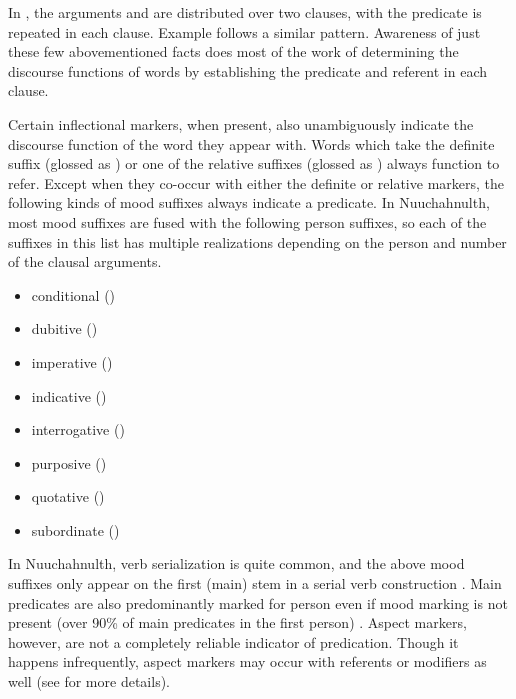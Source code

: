 
\noindent In , the arguments   and   are distributed over two clauses, with the predicate  is repeated in each clause. Example  follows a similar pattern. Awareness of just these few abovementioned facts does most of the work of determining the discourse functions of words by establishing the predicate and referent in each clause.

Certain inflectional markers, when present, also unambiguously indicate the discourse function of the word they appear with. Words which take the definite suffix  (glossed as ) or one of the relative suffixes (glossed as ) always function to refer. Except when they co-occur with either the definite or relative markers, the following kinds of mood suffixes always indicate a predicate. In Nuuchahnulth, most mood suffixes are fused with the following person suffixes, so each of the suffixes in this list has multiple realizations depending on the person and number of the clausal arguments.

\begin{itemize}
  \singlespacing
  \item conditional ()
  \item dubitive ()
  \item imperative ()
  \item indicative ()
  \item interrogative ()
  \item purposive ()
  \item quotative ()
  \item subordinate ()
\end{itemize}

\noindent In Nuuchahnulth, verb serialization is quite common, and the above mood suffixes only appear on the first (main) stem in a serial verb construction \parencite[42]{Nakayama2001}. Main predicates are also predominantly marked for person even if mood marking is not present (over 90\% of main predicates in the first person) \parencite[29]{Nakayama2001}. Aspect markers, however, are not a completely reliable indicator of predication. Though it happens infrequently, aspect markers may occur with referents or modifiers as well (see  for more details).

